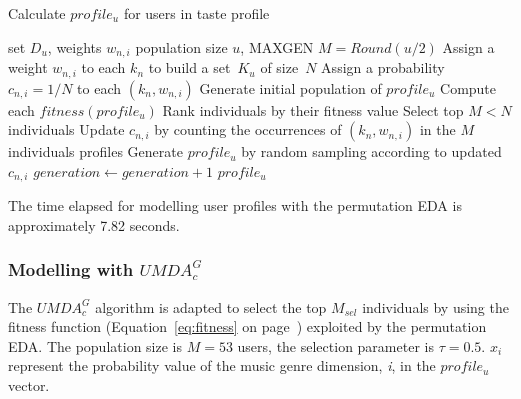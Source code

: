 \begin{algorithm}[ht!]
	\caption{Calculate $profile_u$ for users in taste profile}
	\begin{algorithmic} 
		\REQUIRE set $D_u$, weights $w_{n,i}$
		\REQUIRE population size $u$, MAXGEN
		\REQUIRE $M = Round(u/2)$
		\STATE Assign a weight $w_{n,i}$ to each $k_n$ to build a set~$K_u$ of size~$N$
		\STATE Assign a probability $c_{n,i}=1/N$ to each $(k_n,w_{n,i})$
		\STATE Generate initial population of $profile_u$
		\STATE Compute each $fitness(profile_u)$
		\STATE Rank individuals by their fitness value
		\STATE Select top $M < N$ individuals
		\STATE Update $c_{n,i}$ by counting the occurrences of $(k_n,w_{n,i})$ in the $M$ individuals profiles
		\STATE Generate $profile_u$ by random sampling according to updated $c_{n,i}$
		\STATE $generation\leftarrow generation+1$
		\ENDWHILE
		\RETURN $profile_u$
	\end{algorithmic}
	\label{alg:permutationeda}
\end{algorithm}

The time elapsed for modelling user profiles with the permutation EDA is approximately 7.82 seconds.

\subsubsection{Modelling with $UMDA_c^G$}
The $UMDA_c^G$ algorithm is adapted to select the top $M_{sel}$ individuals by using the fitness function (Equation~\eqref{eq:fitness} on page~\pageref{eq:fitness}) exploited by the permutation EDA. The population size is $M=53$ users, the selection parameter is $\tau=0.5$. $x_i$ represent the probability value of the music genre dimension, \emph{i}, in the $profile_u$ vector.


